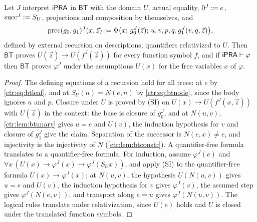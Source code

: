 \begin{proposition}\label{ctr:prop:btJ}
Let $J$ interpret $\mathsf{iPRA}$ in $\mathsf{BT}$ with the domain $U$, actual equality, $0^J\mathrel{:=} e$,
$\mathrm{succ}^J\mathrel{:=} S_U$, projections and composition by themselves, and
\[
 \mathrm{prec}(g_0,g_1)^J(x,\vec z)\mathrel{:=}
 \Phi\bigl(x;\,g_0^J(\vec z);\,u,v,p,q.\,g_1^J(v,q,\vec z)\bigr),
\]
defined by external recursion on descriptions, quantifiers relativized to $U$. Then
$\mathsf{BT}$ proves $U(\vec z)\to U(f^J(\vec z))$ for every function symbol $f$, and if
$\mathsf{iPRA}\vdash\varphi$ then $\mathsf{BT}$ proves $\varphi^J$ under the assumptions $U(x)$ for the
free variables $x$ of $\varphi$.
\end{proposition}
\begin{proof}
The defining equations of a recursion hold for all trees: at $e$ by \eqref{ctr:eq:btleaf},
and at $S_U(n)=N(e,n)$ by \eqref{ctr:eq:btnode}, since the body ignores $u$ and $p$. Closure
under $U$ is proved by (SI) on $U(x)\to U(f^J(x,\vec z))$ with $U(\vec z)$ in the context: the
base is closure of $g_0^J$, and at $N(u,v)$, \cref{ctr:lem:btunary} gives $u=e$ and $U(v)$, the
induction hypothesis for $v$ and closure of $g_1^J$ give the claim. Separation of the successor
is $N(e,x)\neq e$, and injectivity is the injectivity of $N$ (\cref{ctr:lem:btconstr}). A
quantifier-free formula translates to a quantifier-free formula. For induction, assume
$\varphi^J(e)$ and $\forall x\,(U(x)\to\varphi^J(x)\to\varphi^J(S_U x))$, and apply (SI) to the
quantifier-free formula $U(x)\to\varphi^J(x)$: at $N(u,v)$, the hypothesis $U(N(u,v))$ gives
$u=e$ and $U(v)$, the induction hypothesis for $v$ gives $\varphi^J(v)$, the assumed step gives
$\varphi^J(N(e,v))$, and transport along $e=u$ gives $\varphi^J(N(u,v))$. The logical rules
translate under relativization, since $U(e)$ holds and $U$ is closed under the translated
function symbols.
\end{proof}

